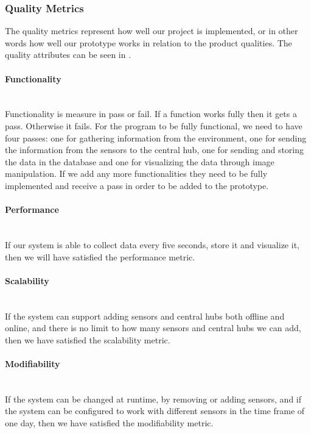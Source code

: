 \documentclass[../document.tex]{subfiles}
\begin{document}
\subsubsection{Quality Metrics}
\label{subsubsec:quality_metrics}
The quality metrics represent how well our project is implemented, or in other words how well our prototype works in relation to the product qualities. The quality attributes can be seen in .

\paragraph{Functionality} \ \\
Functionality is measure in pass or fail. If a function works fully then it gets a pass. Otherwise it fails. For the program to be fully functional, we need to have four passes: one for gathering information from the environment, one for sending the information from the sensors to the central hub, one for sending and storing the data in the database and one for visualizing the data through image manipulation. If we add any more functionalities they need to be fully implemented and receive a pass in order to be added to the prototype.

\paragraph{Performance} \ \\
If our system is able to collect data every five seconds, store it and visualize it, then we will have satisfied the performance metric.

\paragraph{Scalability} \ \\
If the system can support adding sensors and central hubs both offline and online, and there is no limit to how many sensors and central hubs we can add, then we have satisfied the scalability metric.

\paragraph{Modifiability} \ \\
If the system can be changed at runtime, by removing or adding sensors, and if the system can be configured to work with different sensors in the time frame of one day, then we have satisfied the modifiability metric.
\end{document}
